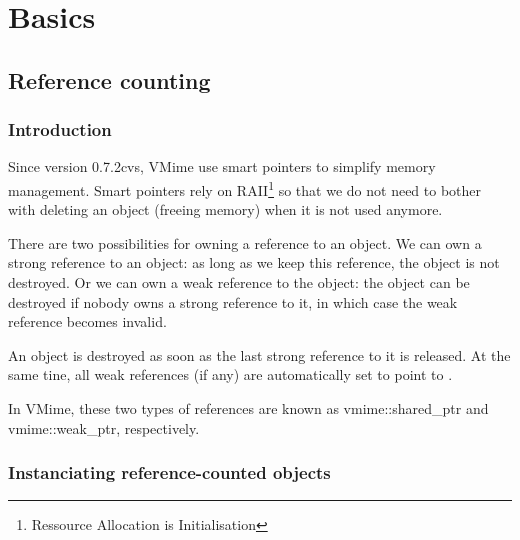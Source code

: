 \chapter{Basics}

\section{Reference counting}

\subsection{Introduction} %

Since version 0.7.2cvs, VMime use smart pointers to simplify memory
management. Smart pointers rely on
RAII\footnote{Ressource Allocation is Initialisation} so that we do not need
to bother with deleting an object (freeing memory) when it is not used
anymore.

There are two possibilities for owning a reference to an object. We can own a
strong reference to an object: as long as we keep this reference, the object
is not destroyed. Or we can own a weak reference to the object: the object can
be destroyed if nobody owns a strong reference to it, in which case the weak
reference becomes invalid.

An object is destroyed as soon as the last strong reference to it is released.
At the same tine, all weak references (if any) are automatically set to point
to \vnull.

In VMime, these two types of references are known as {\vcode vmime::shared\_ptr}
and {\vcode vmime::weak\_ptr}, respectively.


\subsection{Instanciating reference-counted objects} %

